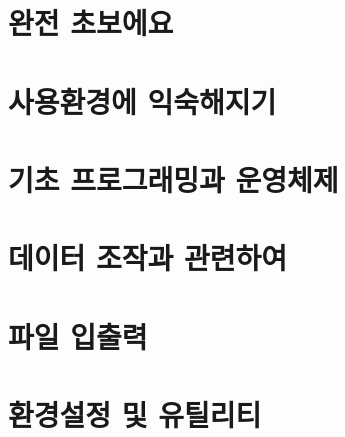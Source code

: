 %
%
%
%
%
%



\chapter{완전 초보에요}


\chapter{사용환경에 익숙해지기}


\chapter{기초 프로그래밍과 운영체제}


\chapter{데이터 조작과 관련하여}


\chapter{파일 입출력}


\chapter{환경설정 및 유틸리티}

